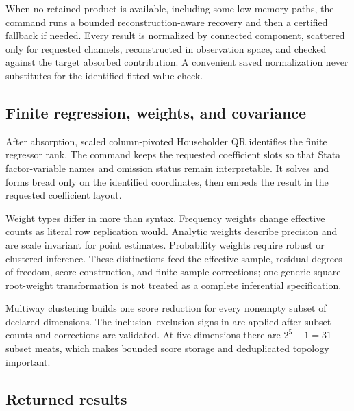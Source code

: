 \documentclass[11pt]{article}
\begin{document}
When no retained product is available, including some low-memory paths, the
command runs a bounded reconstruction-aware recovery and then a certified
fallback if needed.  Every result is normalized by connected component,
scattered only for requested channels, reconstructed in observation space,
and checked against the target absorbed contribution.  A convenient saved
normalization never substitutes for the identified fitted-value check.

\subsection{Finite regression, weights, and covariance}

After absorption, scaled column-pivoted Householder QR identifies the finite
regressor rank.  The command keeps the requested coefficient slots so that
Stata factor-variable names and omission status remain interpretable.  It
solves and forms bread only on the identified coordinates, then embeds the
result in the requested coefficient layout.

Weight types differ in more than syntax.  Frequency weights change effective
counts as literal row replication would.  Analytic weights describe
precision and are scale invariant for point estimates.  Probability weights
require robust or clustered inference.  These distinctions feed the
effective sample, residual degrees of freedom, score construction, and
finite-sample corrections; one generic square-root-weight transformation is
not treated as a complete inferential specification.

Multiway clustering builds one score reduction for every nonempty subset of
declared dimensions.  The inclusion--exclusion signs in
 are applied after subset counts and corrections are
validated.  At five dimensions there are $2^5-1=31$ subset meats, which makes
bounded score storage and deduplicated topology important.

\subsection{Returned results}
\end{document}
